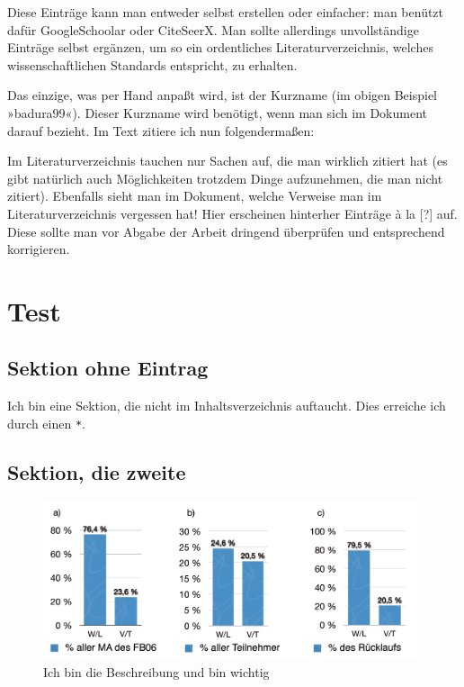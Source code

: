   Diese Einträge kann man entweder selbst erstellen oder einfacher: man benützt dafür GoogleSchoolar oder CiteSeerX. Man sollte allerdings unvollständige Einträge selbst ergänzen, um so ein ordentliches Literaturverzeichnis, welches wissenschaftlichen Standards entspricht, zu erhalten. 
  
  Das einzige, was per Hand anpaßt wird, ist der Kurzname (im obigen Beispiel »badura99«). Dieser Kurzname wird benötigt, wenn man sich im Dokument darauf bezieht. Im Text zitiere ich nun folgendermaßen:


  Im Literaturverzeichnis tauchen nur Sachen auf, die man wirklich zitiert hat (es gibt natürlich auch Möglichkeiten trotzdem Dinge aufzunehmen, die man nicht zitiert). Ebenfalls sieht man im Dokument, welche Verweise man im Literaturverzeichnis vergessen hat! Hier erscheinen hinterher Einträge à la [?] auf. Diese sollte man vor Abgabe der Arbeit dringend überprüfen und entsprechend korrigieren.


  \section{Test}
  \label{test}
  
    \subsection*{Sektion ohne Eintrag}
    
    Ich bin eine Sektion, die nicht im Inhaltsverzeichnis auftaucht. Dies erreiche ich durch einen \texttt{*}.
    
    \subsection*{Sektion, die zweite}
    
    \begin{figure}[h!]
      \centering
      \includegraphics[width=11cm]{bilder/bild1.png} 
      \caption{Ich bin die Beschreibung und bin wichtig}
      \label{bild1}
    \end{figure}
    
